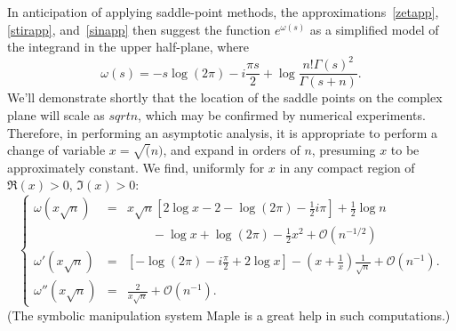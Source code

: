 \documentclass{amsart}
\def\ds{\displaystyle}
\begin{document}
In anticipation of applying saddle-point methods, 
the approximations~\eqref{zetapp}, \eqref{stirapp}, and~\eqref{sinapp}
then suggest the function $e^{\omega(s)}$
 as a simplified model of the integrand in the upper half-plane, where
\begin{equation}\label{omdef}
\omega(s)=-s\log(2\pi)-i\frac{\pi s}{2}+\log\frac{n! \Gamma(s)^2}{\Gamma(s+n)}.
\end{equation}
We'll demonstrate shortly that the location of the saddle 
points on the complex plane will scale as $sqrt{n}$, which may be confirmed 
by numerical experiments. Therefore, in performing an asymptotic analysis,
it is appropriate to perform a change of variable $x=\sqrt(n)$, 
and expand in orders of $n$, presuming $x$ to be approximately constant.
We find, uniformly for $x$ in any compact region of $\Re(x)>0$, $\Im(x)>0$:
\begin{equation}\label{om012}
\left\{\begin{array}{lll}
\omega(x\sqrt{n})&=&\ds x\sqrt{n}\left[2\log x-2-\log(2\pi)-\frac12i\pi \right]+\frac12\log n
\\
&&\ds \qquad -\log x +\log(2\pi)-\frac12x^2+\mathcal{O}(n^{-1/2})
\\
\omega'(x\sqrt{n})&=& \ds \left[-\log(2\pi) -i\frac{\pi}{2}+2\log x\right]
-\left(x+\frac1x\right)\frac{1}{\sqrt{n}}+\mathcal{O}(n^{-1}).
\\
\omega''(x\sqrt{n})&=&\ds \frac{2}{x\sqrt{n}}+\mathcal{O}(n^{-1}).
\end{array}\right. 
\end{equation}
(The symbolic manipulation system {\sc Maple} is a great help in such computations.)
\end{document}
